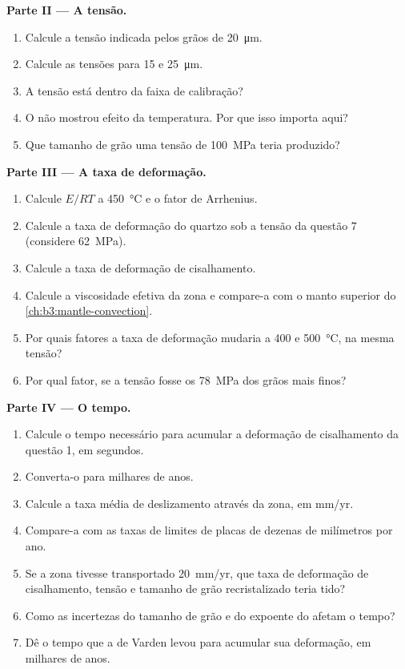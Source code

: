 \begin{problem}
\medskip\noindent\textbf{Parte II --- A tensão.}
\begin{enumerate}[resume]
  \item Calcule a tensão indicada pelos grãos de \qty{20}{\micro m}.
  \item Calcule as tensões para 15 e \qty{25}{\micro m}.
  \item A tensão está dentro da faixa de calibração?
  \item O  não mostrou efeito da temperatura. Por que isso importa
        aqui?
  \item Que tamanho de grão uma tensão de \qty{100}{MPa} teria produzido?
\end{enumerate}

\medskip\noindent\textbf{Parte III --- A taxa de deformação.}
\begin{enumerate}[resume]
  \item Calcule $E/RT$ a \qty{450}{\celsius} e o fator de Arrhenius.
  \item Calcule a taxa de deformação do quartzo sob a tensão da questão 7
        (considere \qty{62}{MPa}).
  \item Calcule a taxa de deformação de cisalhamento.
  \item Calcule a viscosidade efetiva da zona e compare-a com o
        manto superior do \cref{ch:b3:mantle-convection}.
  \item Por quais fatores a taxa de deformação mudaria a 400 e
        \qty{500}{\celsius}, na mesma tensão?
  \item Por qual fator, se a tensão fosse os \qty{78}{MPa} dos grãos mais
        finos?
\end{enumerate}

\medskip\noindent\textbf{Parte IV --- O tempo.}
\begin{enumerate}[resume]
  \item Calcule o tempo necessário para acumular a deformação de cisalhamento da questão 1,
        em segundos.
  \item Converta-o para milhares de anos.
  \item Calcule a taxa média de deslizamento através da zona, em \unit{mm/yr}.
  \item Compare-a com as taxas de limites de placas de dezenas de milímetros por ano.
  \item Se a zona tivesse transportado \qty{20}{mm/yr}, que taxa de deformação de cisalhamento, tensão
        e tamanho de grão recristalizado teria tido?
  \item Como as incertezas do tamanho de grão e do expoente do 
        afetam o tempo?
  \item Dê o tempo que a  de Varden levou para acumular sua deformação, em
        milhares de anos.
\end{enumerate}
\end{problem}
